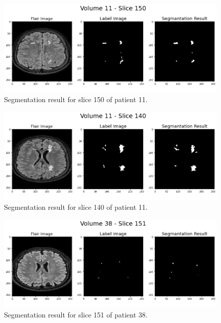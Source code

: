 \documentclass[12pt]{extarticle}
\begin{document}
\begin{figure}[h!]
\centering
\includegraphics[width = \textwidth]{volume-011-150.png}
\caption{Segmentation result for slice 150 of patient 11.}
\label{fig:volume-011-150}
\end{figure}

\begin{figure}[h!]
\centering
\includegraphics[width = \textwidth]{volume-011-140.png}
\caption{Segmentation result for slice 140 of patient 11.}
\label{fig:volume-011-140}
\end{figure}

\begin{figure}[h!]
\centering
\includegraphics[width = \textwidth]{volume-038-151.png}
\caption{Segmentation result for slice 151 of patient 38.}
\label{fig:volume-038-151}
\end{figure}
\end{document}

